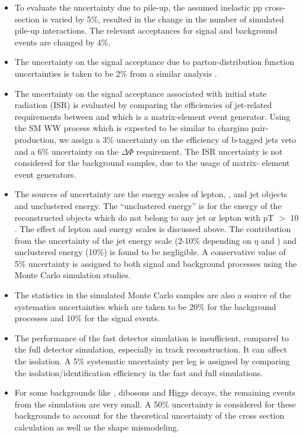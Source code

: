 \begin{itemize}
\item To evaluate the uncertainty due to pile-up, the assumed inelastic pp cross-section is
  varied by 5\%, resulted in the change in the number of simulated pile-up interactions.
 The relevant acceptances for signal and background events are changed by 4\%.


\item The uncertainty on the signal acceptance due to parton-distribution function uncertainties 
  is taken to be 2\% from a similar analysis \cite{Khachatryan:2014qwa}.

\item The uncertainty on the signal acceptance associated with initial state radiation (ISR)
is evaluated by comparing the efficiencies of jet-related requirements between \PYTHIA
 and \MADGRAPH which is a matrix-element event generator. Using the SM WW process which
 is expected to be similar to chargino pair-production, we assign a 3\% uncertainty on 
the efficiency of  b-tagged jets veto and a 6\% uncertainty on the $\Delta \Phi$ requirement. The ISR
 uncertainty is not considered for the background samples, due to the usage of matrix-
 element event generators.

\item The sources of \MPT uncertainty are the energy scales of lepton, \Tau, and jet
objects and unclustered energy.  The ``unclustered energy'' is for the energy of the reconstructed objects which
 do not belong to any jet or lepton with pT $>$ 10 \GeV. The effect of lepton and \Tau
 energy scales is discussed above. The contribution from the uncertainty of the jet energy scale (2-10\% depending on $\eta$  and \PT) and
 unclustered energy (10\%) is found to be negligible. A conservative value of 5\% uncertainty
 is assigned to both signal and background processes using the Monte
 Carlo simulation studies.

\item The statistics in the simulated Monte Carlo samples are also a
 source of the systematics uncertainties which are taken to be 20\% for the background processes and 10\% for the signal events.

\item The performance of the fast detector simulation is insufficient, compared to the full detector simulation, especially in
 track reconstruction. It can affect the \Tau isolation. A 5\% systematic uncertainty per
 \Tau leg is assigned by comparing the \Tau isolation/identification efficiency in the fast
 and full simulations.

\item For some backgrounds like \ttbar,  dibosons and Higgs decays, the remaining 
events from the simulation are very small. A 50\% uncertainty is considered for these backgrounds to account for the theoretical uncertainty of the
cross section calculation as well as the shape mismodeling.
\end{itemize}


